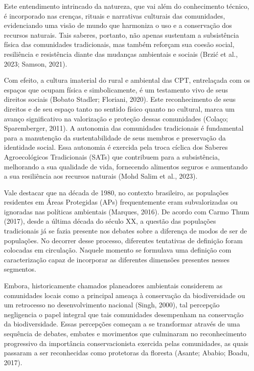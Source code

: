 Este entendimento intrincado da natureza, que vai além do conhecimento técnico, é incorporado nas crenças, rituais e narrativas culturais das comunidades, evidenciando uma visão de mundo que harmoniza o uso e a conservação dos recursos naturais. Tais saberes, portanto, não apenas sustentam a subsistência física das comunidades tradicionais, mas também reforçam sua coesão social, resiliência e resistência diante das mudanças ambientais e sociais (Brzić et al., 2023; Samson, 2021).

Com efeito, a cultura imaterial do rural e ambiental das CPT, entrelaçada com os espaços que ocupam física e simbolicamente, é um testamento vivo de seus direitos sociais (Bobato Stadler; Floriani, 2020). Este reconhecimento de seus direitos e de seu espaço tanto no sentido físico quanto no cultural, marca um avanço significativo na valorização e proteção dessas comunidades (Colaço; Sparemberger, 2011).
A autonomia das comunidades tradicionais é fundamental para a manutenção da sustentabilidade de seus membros e preservação da identidade social. Essa autonomia é exercida pela troca cíclica dos Saberes Agroecológicos Tradicionais (SATs) que contribuem para a subsistência, melhorando a sua qualidade de vida, fornecendo alimentos seguros e aumentando a sua resiliência aos recursos naturais (Mohd Salim et al., 2023). 

Vale destacar que na década de 1980, no contexto brasileiro, as populações residentes em Áreas Protegidas (APs) frequentemente eram subvalorizadas ou ignoradas nas políticas ambientais (Marques, 2016). De acordo com Carmo Thum (2017), desde a última década do século XX, a questão das populações tradicionais já se fazia presente nos debates sobre a diferença de modos de ser de populações. No decorrer desse processo, diferentes tentativas de definição foram colocadas em circulação. Naquele momento se formulava uma definição com caracterização capaz de incorporar as diferentes dimensões presentes nesses segmentos.

Embora, historicamente chamados planeadores ambientais considerem as comunidades locais como a principal ameaça à conservação da biodiversidade ou um retrocesso no desenvolvimento nacional (Singh, 2000), tal percepção negligencia o papel integral que tais comunidades desempenham na conservação da biodiversidade. Essas percepções começam a se transformar através de uma sequência de debates, embates e movimentos que culminaram no reconhecimento progressivo da importância conservacionista exercida pelas comunidades, as quais passaram a ser reconhecidas como protetoras da floresta (Asante; Ababio; Boadu, 2017).


